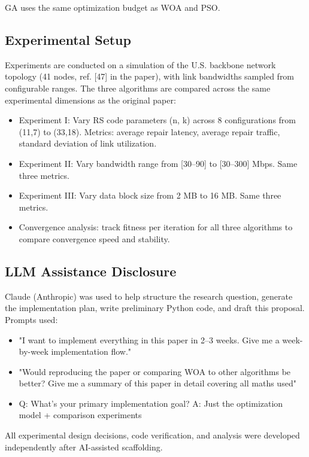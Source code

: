 \documentclass[sigconf]{acmart}
\begin{document}
GA uses the same optimization budget as WOA and PSO.

\subsection{Experimental Setup}

Experiments are conducted on a simulation of the U.S. backbone network topology (41 nodes, ref. [47] in the paper), with link bandwidths sampled from configurable ranges. The three algorithms are compared across the same experimental dimensions as the original paper:
\begin{itemize}
    \item Experiment I: Vary RS code parameters (n, k) across 8 configurations from (11,7) to (33,18). Metrics: average repair latency, average repair traffic, standard deviation of link utilization.
    
    \item Experiment II: Vary bandwidth range from [30–90] to [30–300] Mbps. Same three metrics.
    
    \item Experiment III: Vary data block size from 2 MB to 16 MB. Same three metrics.
    \item Convergence analysis: track fitness per iteration for all three algorithms to compare convergence speed and stability.
\end{itemize}

\subsection{ LLM Assistance Disclosure}

Claude (Anthropic) was used to help structure the research question, generate the implementation plan, write preliminary Python code, and draft this proposal. Prompts used:

\begin{itemize}
    \item "I want to implement everything in this paper in 2–3 weeks. Give me a week-by-week implementation flow."
    \item "Would reproducing the paper or comparing WOA to other algorithms be better? Give me a summary of this paper in detail covering all maths used"
    \item Q: What's your primary implementation goal?
A: Just the optimization model + comparison experiments


\end{itemize}
All experimental design decisions, code verification, and analysis were developed independently after AI-assisted scaffolding.
\end{document}
